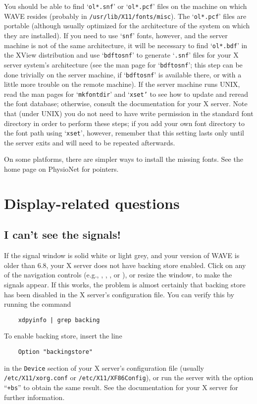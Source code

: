 \documentclass[twoside]{book}
\newcommand{\button}[1]{\cornersize{2}\ovalbox{\rule[-.3mm]{0cm}{2.5mm}\small\sf ~#1~}}
\newcommand{\WAVE}{{\sf WAVE}\xspace}
\begin{document}
You should be able to find `{\tt ol*.snf}' or `{\tt ol*.pcf}' files on the
machine on which \WAVE{} resides (probably in {\tt /usr/lib/X11/fonts/misc}).
The `{\tt ol*.pcf}' files are portable (although usually optimized for the
architecture of the system on which they are installed).  If you need to use
`{\tt snf}' fonts, however, and the server machine is not of the same
architecture, it will be necessary to find `{\tt ol*.bdf}' in the XView
distribution and use `{\tt bdftosnf}' to generate `{\tt .snf}' files
for your X server system's architecture (see the man page for `{\tt bdftosnf}';
this step can be done trivially on the server machine, if `{\tt bdftosnf}' is
available there, or with a little more trouble on the remote machine).  If the
server machine runs UNIX, read the man pages for `{\tt mkfontdir}' and
`{\tt xset'} to see how to update and reread the font database; otherwise,
consult the documentation for your X server.  Note that (under UNIX) you do
not need to have write permission in the standard font directory in order to
perform these steps; if you add your own font directory to the font path using
`{\tt xset}', however, remember that this setting lasts only until the server
exits and will need to be repeated afterwards.

On some platforms, there are simpler ways to install the missing fonts.  See
the  home
page on PhysioNet for pointers.

\section{Display-related questions}

\subsection{I can't see the signals!}

\label{faq:cannot-see-signals}
If the signal window is solid white or light grey, and your version of
\WAVE{} is older than 6.8, your X server does not have backing store enabled.
Click on any of the navigation controls (e.g., \button{\tt <<},
\button{\tt <}, \button{\tt >}, or \button{\tt >>}), or resize the window, to
make the signals appear.  If this works, the problem is almost certainly that
backing store has been disabled in the X server's configuration file.  You can
verify this by running the command
\begin{verbatim}
	xdpyinfo | grep backing
\end{verbatim}
To enable backing store, insert the line
\begin{verbatim}
	Option "backingstore"
\end{verbatim}
in the {\tt Device} section of your X server's configuration file
(usually {\tt /etc/X11/xorg.conf} or {\tt /etc/X11/XF86Config}),
or run the server with the option ``{\tt +bs}'' to obtain the same result.
See the documentation for your X server for further information.
\end{document}
